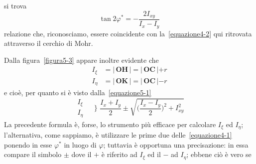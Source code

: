 si trova
\begin{equation*}
\tan 2\varphi^{*} = -\frac{2I_{xy}}{I_{x}-I_{y}}
\end{equation*}
relazione che, riconosciamo, essere coincidente con la~\eqref{equazione4-2} qui ritrovata attraverso il cerchio di Mohr.

\noindent Dalla figura~\ref{figura5-3} appare inoltre evidente che 
\begin{align*}
I_{\xi} &= \lvert \, \mathbf{O}\mathbf{H} \, \lvert = \lvert \, \mathbf{O}\mathbf{C} \, \lvert + r \\
I_{\eta} &= \lvert \, \mathbf{O}\mathbf{K} \, \lvert = \lvert \, \mathbf{O}\mathbf{C} \, \lvert - r 
\end{align*}
e cioè, per quanto si è visto dalla~\eqref{equazione5-1}
\begin{equation*}
\begin{aligned}
I_{\xi} & \\
I_{\eta} &
\end{aligned}
\,\,\Biggr\}\,\, \frac{I_{x}+I_{y}}{2} \pm \sqrt{\biggl(\frac{I_{x}-I_{y}}{2}\biggr)^{2}+I_{xy}^{2}}
\end{equation*}
La precedente formula è, forse, lo strumento più efficace per calcolare $I_{\xi}$ ed $I_{\eta}$; l'alternativa, come sappiamo, è utilizzare le prime due delle~\eqref{equazione4-1} ponendo in esse $\varphi^{*}$ in luogo di $\varphi$; tuttavia è opportuna una precisazione: in essa compare il simbolo $\pm$ dove il $+$ è riferito ad $I_{\xi}$ ed il $-$ ad $I_{\eta}$; ebbene ciò è vero se 
